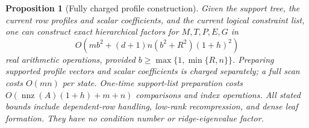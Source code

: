 \documentclass[11pt]{amsart}
\newtheorem{proposition}[theorem]{Proposition}
\theoremstyle{definition}\newtheorem{definition}[theorem]{Definition}
\theoremstyle{remark}\newtheorem{remark}[theorem]{Remark}
\numberwithin{equation}{section}
\begin{document}
\begin{proposition}[Fully charged profile construction]
\label{ifc:prop:profileconstruction}
Given the support tree, the current row profiles and scalar coefficients,
and the current logical constraint list, one can construct exact
hierarchical factors for $M,T,P,E,G$ in
\begin{equation}\label{ifc:eq:profileconstruction}
 O\!\left(mb^2+(d+1)n(b^2+R^2)(1+h)^2\right)
\end{equation}
real arithmetic operations, provided $b\ge\max\{1,\min\{R,n\}\}$.
Preparing supported profile vectors and scalar coefficients is charged
separately; a full scan costs $O(mn)$ per state. One-time support-list
preparation costs $O(\operatorname{nnz}(A)(1+h)+m+n)$ comparisons and
index operations. All stated bounds include dependent-row handling,
low-rank recompression, and dense leaf formation. They have no condition
number or ridge-eigenvalue factor.
\end{proposition}
\end{document}
